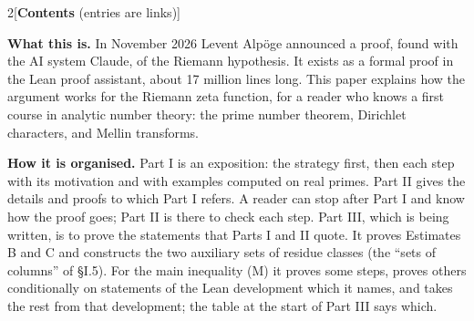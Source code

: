 \documentclass[11pt,letterpaper]{article}
\begin{document}
{\small\setcounter{tocdepth}{1}\makeatletter\renewcommand{\l@part}[2]{\par\addvspace{4pt}\penalty-200\noindent\textbf{#1}\par\nobreak}\renewcommand{\@pnumwidth}{1.6em}\renewcommand{\l@section}{\@dottedtocline{1}{0em}{2.7em}}\makeatother
\setlength{\columnsep}{22pt}\begin{multicols}{2}[\noindent\textbf{Contents} {\footnotesize (entries are links)}]\makeatletter{}\makeatother\end{multicols}}

\noindent\textbf{What this is.} In November 2026 Levent Alp\"oge announced a proof, found with the AI system
Claude, of the Riemann hypothesis. It exists as a formal proof in the Lean proof assistant, about 17 million
lines long. This paper explains how the argument works for the Riemann zeta function, for a reader who knows
a first course in analytic number theory: the prime number theorem, Dirichlet characters, and Mellin
transforms.

\noindent\textbf{How it is organised.} Part I is an exposition: the strategy first, then each step with its
motivation and with examples computed on real primes. Part II gives the details and proofs to which Part I
refers. A reader can stop after Part I and know how the proof goes; Part II is there to check each step.
Part III, which is being written, is to prove the statements that Parts I and II quote. It proves Estimates B and C
and constructs the two auxiliary sets of residue classes (the ``sets of columns'' of \S I.5). For the main inequality (M)
it proves some steps, proves others conditionally on statements of the Lean development which it names, and takes the
rest from that development; the table at the start of Part III says which.
\end{document}
